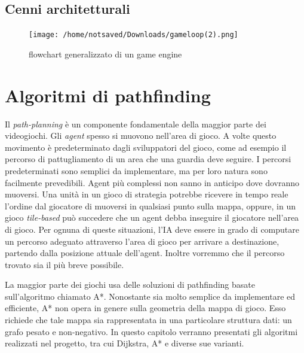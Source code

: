\documentclass[12pt]{book}
\begin{document}
\section{Cenni architetturali}

\begin{figure}[htp]
\centering
\texttt{[image: /home/notsaved/Downloads/gameloop(2).png]}
\caption{flowchart generalizzato di un game engine}
\label{gameloop}
\end{figure} \fi
\chapter{Algoritmi di pathfinding}
\par{Il \emph{path-planning} \`e un componente fondamentale della maggior parte dei videogiochi.
Gli \emph{agent} spesso si muovono nell'area di gioco. A volte questo movimento \`e predeterminato dagli sviluppatori del gioco, come ad esempio il percorso di pattugliamento di un area che una guardia deve seguire. I percorsi predeterminati sono semplici da implementare, ma per loro natura sono facilmente prevedibili. Agent pi\`u complessi non sanno in anticipo dove dovranno muoversi. Una unit\`a in un gioco di strategia potrebbe ricevere in tempo reale l'ordine dal giocatore di muoversi in qualsiasi punto sulla mappa, oppure, in un gioco \emph{tile-based} pu\`o succedere che un agent debba inseguire il giocatore nell'area di gioco.
Per ognuna di queste situazioni, l'IA deve essere in grado di computare un percorso adeguato attraverso l'area di gioco per arrivare a destinazione, partendo dalla posizione attuale dell'agent. Inoltre vorremmo che il percorso trovato sia il pi\`u breve possibile.}
\par{La maggior parte dei giochi usa delle soluzioni di pathfinding basate sull'algoritmo chiamato A*. Nonostante sia molto semplice da implementare ed efficiente, A* non opera in genere sulla geometria della mappa di gioco. Esso richiede che tale mappa sia rappresentata in una particolare struttura dati: un grafo pesato e non-negativo.
In questo capitolo verranno presentati gli algoritmi realizzati nel progetto, tra cui Dijkstra, A* e diverse sue varianti.}
\end{document}
